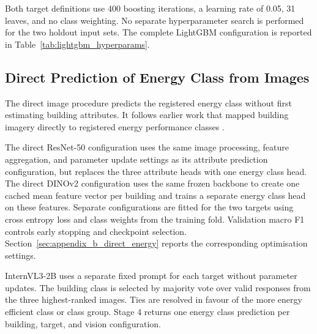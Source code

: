 Both target definitions use 400 boosting iterations, a learning rate of 0.05, 31 leaves, and no class weighting.
No separate hyperparameter search is performed for the two holdout input sets.
The complete \acs{LightGBM} configuration is reported in Table~\ref{tab:lightgbm_hyperparams}.

\subsection{Direct Prediction of Energy Class from Images}
\label{sec:direct_energy_class_prediction}

The direct image procedure predicts the registered energy class without first estimating building attributes.
It follows earlier work that mapped building imagery directly to registered energy performance classes \parencite{mayer2023uk,mayer2023dk}.

The direct ResNet-50 configuration uses the same image processing, feature aggregation, and parameter update settings as its attribute prediction configuration, but replaces the three attribute heads with one energy class head.
The direct DINOv2 configuration uses the same frozen backbone to create one cached mean feature vector per building and trains a separate energy class head on these features.
Separate configurations are fitted for the two targets using cross entropy loss and class weights from the training fold.
Validation macro F1 controls early stopping and checkpoint selection.
Section~\ref{sec:appendix_b_direct_energy} reports the corresponding optimisation settings.

InternVL3-2B uses a separate fixed prompt for each target without parameter updates.
The building class is selected by majority vote over valid responses from the three highest-ranked images.
Ties are resolved in favour of the more energy efficient class or class group.
Stage 4 returns one energy class prediction per building, target, and vision configuration.
